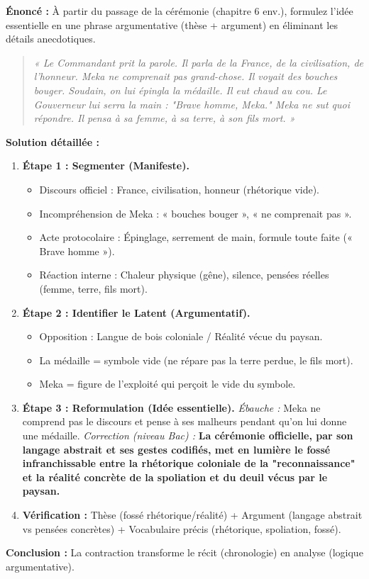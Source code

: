 \documentclass[11pt]{article}
\begin{document}
\begin{exoresolu}
    \textbf{Énoncé :} À partir du passage de la cérémonie (chapitre 6 env.), formulez l'idée essentielle en une phrase argumentative (thèse + argument) en éliminant les détails anecdotiques.
    \begin{quote}
        \textit{« Le Commandant prit la parole. Il parla de la France, de la civilisation, de l'honneur. Meka ne comprenait pas grand-chose. Il voyait des bouches bouger. Soudain, on lui épingla la médaille. Il eut chaud au cou. Le Gouverneur lui serra la main : "Brave homme, Meka." Meka ne sut quoi répondre. Il pensa à sa femme, à sa terre, à son fils mort. »}
    \end{quote}
    \tcblower
    \textbf{Solution détaillée :}
    \begin{enumerate}
        \item \textbf{Étape 1 : Segmenter (Manifeste).}
            \begin{itemize}
                \item Discours officiel : France, civilisation, honneur (rhétorique vide).
                \item Incompréhension de Meka : « bouches bouger », « ne comprenait pas ».
                \item Acte protocolaire : Épinglage, serrement de main, formule toute faite (« Brave homme »).
                \item Réaction interne : Chaleur physique (gêne), silence, pensées réelles (femme, terre, fils mort).
            \end{itemize}
        \item \textbf{Étape 2 : Identifier le Latent (Argumentatif).}
            \begin{itemize}
                \item Opposition : Langue de bois coloniale / Réalité vécue du paysan.
                \item La médaille = symbole vide (ne répare pas la terre perdue, le fils mort).
                \item Meka = figure de l'exploité qui perçoit le vide du symbole.
            \end{itemize}
        \item \textbf{Étape 3 : Reformulation (Idée essentielle).}
            \textit{Ébauche :} Meka ne comprend pas le discours et pense à ses malheurs pendant qu'on lui donne une médaille.
            \textit{Correction (niveau Bac) :} \textbf{La cérémonie officielle, par son langage abstrait et ses gestes codifiés, met en lumière le fossé infranchissable entre la rhétorique coloniale de la "reconnaissance" et la réalité concrète de la spoliation et du deuil vécus par le paysan.}
        \item \textbf{Vérification :} Thèse (fossé rhétorique/réalité) + Argument (langage abstrait vs pensées concrètes) + Vocabulaire précis (rhétorique, spoliation, fossé).
    \end{enumerate}
    \textbf{Conclusion :} La contraction transforme le récit (chronologie) en analyse (logique argumentative).
\end{exoresolu}
\end{document}

